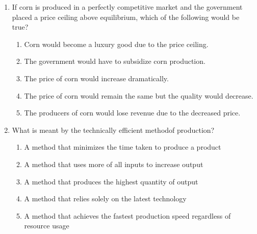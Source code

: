 \documentclass[12pt]{article}
\begin{document}
\begin{enumerate}[label=\arabic*.]
\begin{enumerate}[label=(\alph*)]
    \item The PRF is used to infer likely values of the SRF
    \item Whether the model is good can be determined by comparing the SRF and the PRF
    \item The SRF is a theoretical construct, while the PRF is an empirical construct
\end{enumerate}
\item If corn is produced in a perfectly competitive market and the government placed a price ceiling above equilibrium, which of the following would be true?
\begin{enumerate}[label=(\alph*)]
    \item Corn would become a luxury good due to the price ceiling.
    \item The government would have to subsidize corn production.
    \item The price of corn would increase dramatically.
    \item The price of corn would remain the same but the quality would decrease.
    \item The producers of corn would lose revenue due to the decreased price.
\end{enumerate}
\item What is meant by the technically efficient methodof production?
\begin{enumerate}[label=(\alph*)]
    \item A method that minimizes the time taken to produce a product
    \item A method that uses more of all inputs to increase output
    \item A method that produces the highest quantity of output
    \item A method that relies solely on the latest technology
    \item A method that achieves the fastest production speed regardless of resource usage
\end{enumerate}
\end{enumerate}
\end{document}
